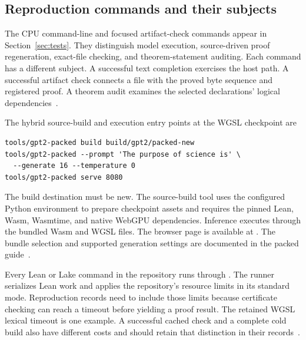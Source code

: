 \subsection{Reproduction commands and their subjects}

The CPU command-line and focused artifact-check commands appear in Section~\ref{sec:tests}.  They distinguish model execution, source-driven proof regeneration, exact-file checking, and theorem-statement auditing.  Each command has a different subject.  A successful text completion exercises the host path.  A successful artifact check connects a file with the proved byte sequence and registered proof.  A theorem audit examines the selected declarations' logical dependencies~\cite{guide,artifactgate,reviewlemmas}.

The hybrid source-build and execution entry points at the WGSL checkpoint are
\begin{verbatim}
tools/gpt2-packed build build/gpt2/packed-new
tools/gpt2-packed --prompt 'The purpose of science is' \
  --generate 16 --temperature 0
tools/gpt2-packed serve 8080
\end{verbatim}
The build destination must be new.  The source-build tool uses the configured Python environment to prepare checkpoint assets and requires the pinned Lean, Wasm, Wasmtime, and native WebGPU dependencies.  Inference executes through the bundled Wasm and WGSL files.  The browser page is available at .  The bundle selection and supported generation settings are documented in the packed guide~\cite{wg-packedguide,wg-build}.

Every Lean or Lake command in the repository runs through .  The runner serializes Lean work and applies the repository's resource limits in its standard mode.  Reproduction records need to include those limits because certificate checking can reach a timeout before yielding a proof result.  The retained WGSL lexical timeout is one example.  A successful cached check and a complete cold build also have different costs and should retain that distinction in their records~\cite{wg-review}.

